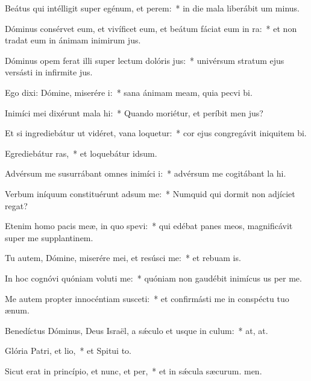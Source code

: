 \item Beátus qui intélligit super egénum, et perem:~* in die mala liberábit um minus.
\item Dóminus consérvet eum, et vivíficet eum, et beátum fáciat eum in ra:~* et non tradat eum in ánimam inimirum jus.
\item Dóminus opem ferat illi super lectum dolóris jus:~* univérsum stratum ejus versásti in infirmite jus.
\item Ego dixi: Dómine, miserére i:~* sana ánimam meam, quia pecvi bi.
\item Inimíci mei dixérunt mala hi:~* Quando moriétur, et períbit men jus?
\item Et si ingrediebátur ut vidéret, vana loquetur:~* cor ejus congregávit iniquitem bi.
\item Egrediebátur ras,~* et loquebátur  idsum.
\item Advérsum me susurrábant omnes inimíci i:~* advérsum me cogitábant la hi.
\item Verbum iníquum constituérunt adsum me:~* Numquid qui dormit non adjíciet  regat?
\item Etenim homo pacis meæ, in quo spevi:~* qui edébat panes meos, magnificávit super me supplantinem.
\item Tu autem, Dómine, miserére mei, et resúsci me:~* et rebuam is.
\item In hoc cognóvi quóniam voluti me:~* quóniam non gaudébit inimícus us per me.
\item Me autem propter innocéntiam susceti:~* et confirmásti me in conspéctu tuo  ænum.
\item Benedíctus Dóminus, Deus Israël, a sǽculo et usque in culum:~* at, at.
\item Glória Patri, et lio,~* et Spitui to.
\item Sicut erat in princípio, et nunc, et per,~* et in sǽcula sæcurum. men.
